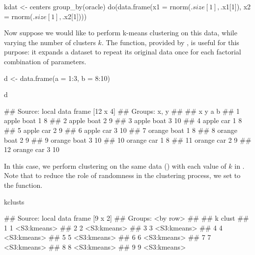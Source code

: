 \begin{example}
kdat <- centers %
    group_by(oracle) %
    do(data.frame(x1 = rnorm(.$size[1], .$x1[1]),
                  x2 = rnorm(.$size[1], .$x2[1])))
\end{example}


Now suppose we would like to perform k-means clustering on this data, while varying the number of clusters $k$. The  function, provided by , is useful for this purpose: it expands a dataset to repeat its original data once for each factorial combination of parameters.


\begin{example}
d <- data.frame(a = 1:3, b = 8:10)
\end{example}

\begin{example}
d %
\end{example}

\begin{example}
## Source: local data frame [12 x 4]
## Groups: x, y
## 
##         x    y a  b
## 1   apple boat 1  8
## 2   apple boat 2  9
## 3   apple boat 3 10
## 4   apple  car 1  8
## 5   apple  car 2  9
## 6   apple  car 3 10
## 7  orange boat 1  8
## 8  orange boat 2  9
## 9  orange boat 3 10
## 10 orange  car 1  8
## 11 orange  car 2  9
## 12 orange  car 3 10

\end{example}


In this case, we perform clustering on the same data () with each value of $k$ in . Note that to reduce the role of randomness in the clustering process, we set  to the  function.



\begin{example}
kclusts
\end{example}

\begin{example}
## Source: local data frame [9 x 2]
## Groups: <by row>
## 
##   k       clust
## 1 1 <S3:kmeans>
## 2 2 <S3:kmeans>
## 3 3 <S3:kmeans>
## 4 4 <S3:kmeans>
## 5 5 <S3:kmeans>
## 6 6 <S3:kmeans>
## 7 7 <S3:kmeans>
## 8 8 <S3:kmeans>
## 9 9 <S3:kmeans>

\end{example}


